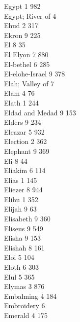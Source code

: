 Egypt \hfill 1 \quad \phantom{0}982\\
Egypt; River of \hfill 4 \\
Ehud \hfill 2 \quad \phantom{0}317\\
Ekron \hfill 9 \quad \phantom{0}225\\
El \hfill 8 \quad \phantom{0}\phantom{0}35\\
El Elyon \hfill 7 \quad \phantom{0}880\\
El-bethel \hfill 6 \quad \phantom{0}285\\
El-elohe-Israel \hfill 9 \quad \phantom{0}378\\
Elah; Valley of \hfill 7 \\
Elam \hfill 4 \quad \phantom{0}\phantom{0}76\\
Elath \hfill 1 \quad \phantom{0}244\\
Eldad and Medad \hfill 9 \quad \phantom{0}153\\
Elders \hfill 9 \quad \phantom{0}234\\
Eleazar \hfill 5 \quad \phantom{0}932\\
Election \hfill 2 \quad \phantom{0}362\\
Elephant \hfill 9 \quad \phantom{0}369\\
Eli \hfill 8 \quad \phantom{0}\phantom{0}44\\
Eliakim \hfill 6 \quad \phantom{0}114\\
Elias \hfill 1 \quad \phantom{0}145\\
Eliezer \hfill 8 \quad \phantom{0}944\\
Elihu \hfill 1 \quad \phantom{0}352\\
Elijah \hfill 9 \quad \phantom{0}\phantom{0}63\\
Elisabeth \hfill 9 \quad \phantom{0}360\\
Eliseus \hfill 9 \quad \phantom{0}549\\
Elisha \hfill 9 \quad \phantom{0}153\\
Elishah \hfill 8 \quad \phantom{0}161\\
Eloi \hfill 5 \quad \phantom{0}104\\
Eloth \hfill 6 \quad \phantom{0}303\\
Elul \hfill 5 \quad \phantom{0}365\\
Elymas \hfill 3 \quad \phantom{0}876\\
Embalming \hfill 4 \quad \phantom{0}184\\
Embroidery \hfill 6 \\
Emerald \hfill 4 \quad \phantom{0}175\\
